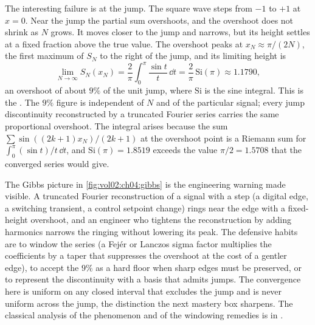 The interesting failure is at the jump. The square wave steps from
$-1$ to $+1$ at $x = 0$. Near the jump the partial sum overshoots, and
the overshoot does not shrink as $N$ grows. It moves closer to the jump
and narrows, but its height settles at a fixed fraction above the true
value. The overshoot peaks at $x_{N} \approx \pi/(2N)$, the first
maximum of $S_{N}$ to the right of the jump, and its limiting height is
\[
\lim_{N \to \infty} S_{N}(x_{N}) = \frac{2}{\pi} \int_{0}^{\pi}
\frac{\sin t}{t} \, \dd t = \frac{2}{\pi}\,\mathrm{Si}(\pi) \approx
1.1790,
\]
an overshoot of about $9\%$ of the unit jump, where $\mathrm{Si}$ is
the sine integral. This is the . The
$9\%$ figure is independent of $N$ and of the particular signal; every
jump discontinuity reconstructed by a truncated Fourier series carries
the same proportional overshoot. The integral arises because the sum
$\sum \sin((2k+1)x_{N})/(2k+1)$ at the overshoot point is a Riemann sum
for $\int_{0}^{\pi} (\sin t)/t \, \dd t$, and $\mathrm{Si}(\pi) =
1.8519$ exceeds the value $\pi/2 = 1.5708$ that the converged series
would give.



The Gibbs picture in \autoref{fig:vol02:ch04:gibbs} is the engineering
warning made visible. A truncated Fourier reconstruction of a signal
with a step (a digital edge, a switching transient, a control setpoint
change) rings near the edge with a fixed-height overshoot, and an
engineer who tightens the reconstruction by adding harmonics narrows
the ringing without lowering its peak. The defensive habits are to
window the series (a Fej\'{e}r or Lanczos sigma factor multiplies the
coefficients by a taper that suppresses the overshoot at the cost of a
gentler edge), to accept the $9\%$ as a hard floor when sharp edges
must be preserved, or to represent the discontinuity with a basis that
admits jumps. The convergence here is uniform on any closed interval
that excludes the jump and is never uniform across the jump, the
distinction the next mastery box sharpens. The classical analysis of
the phenomenon and of the windowing remedies is in
\cite{hist:fourier1822,text:v2ch03-stein-shakarchi-complex}.

